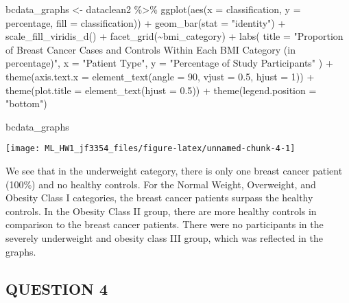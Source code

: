\documentclass[
]{article}
\newenvironment{Shaded}{\begin{snugshade}}{\end{snugshade}}
\newcommand{\AttributeTok}[1]{\textcolor[rgb]{0.77,0.63,0.00}{#1}}
\newcommand{\DecValTok}[1]{\textcolor[rgb]{0.00,0.00,0.81}{#1}}
\newcommand{\FloatTok}[1]{\textcolor[rgb]{0.00,0.00,0.81}{#1}}
\newcommand{\FunctionTok}[1]{\textcolor[rgb]{0.00,0.00,0.00}{#1}}
\newcommand{\NormalTok}[1]{#1}
\newcommand{\OtherTok}[1]{\textcolor[rgb]{0.56,0.35,0.01}{#1}}
\newcommand{\SpecialCharTok}[1]{\textcolor[rgb]{0.00,0.00,0.00}{#1}}
\newcommand{\StringTok}[1]{\textcolor[rgb]{0.31,0.60,0.02}{#1}}
\begin{document}
\begin{Shaded}
\begin{Highlighting}[]
\NormalTok{bcdata\_graphs }\OtherTok{\textless{}{-}}\NormalTok{ dataclean2 }\SpecialCharTok{\%\textgreater{}\%}
  \FunctionTok{ggplot}\NormalTok{(}\FunctionTok{aes}\NormalTok{(}\AttributeTok{x =}\NormalTok{ classification, }\AttributeTok{y =}\NormalTok{ percentage, }\AttributeTok{fill =}\NormalTok{ classification)) }\SpecialCharTok{+}
  \FunctionTok{geom\_bar}\NormalTok{(}\AttributeTok{stat =} \StringTok{"identity"}\NormalTok{) }\SpecialCharTok{+}
  \FunctionTok{scale\_fill\_viridis\_d}\NormalTok{() }\SpecialCharTok{+}
  \FunctionTok{facet\_grid}\NormalTok{(}\SpecialCharTok{\textasciitilde{}}\NormalTok{bmi\_category) }\SpecialCharTok{+}
  \FunctionTok{labs}\NormalTok{(}
    \AttributeTok{title =} \StringTok{"Proportion of Breast Cancer Cases and }
\StringTok{    Controls Within Each BMI Category (in percentage)"}\NormalTok{,}
    \AttributeTok{x =} \StringTok{"Patient Type"}\NormalTok{,}
    \AttributeTok{y =} \StringTok{"Percentage of Study Participants"}
\NormalTok{  ) }\SpecialCharTok{+} \FunctionTok{theme}\NormalTok{(}\AttributeTok{axis.text.x =} \FunctionTok{element\_text}\NormalTok{(}\AttributeTok{angle =} \DecValTok{90}\NormalTok{, }\AttributeTok{vjust =} \FloatTok{0.5}\NormalTok{, }\AttributeTok{hjust =} \DecValTok{1}\NormalTok{)) }\SpecialCharTok{+} \FunctionTok{theme}\NormalTok{(}\AttributeTok{plot.title =} \FunctionTok{element\_text}\NormalTok{(}\AttributeTok{hjust =} \FloatTok{0.5}\NormalTok{)) }\SpecialCharTok{+} \FunctionTok{theme}\NormalTok{(}\AttributeTok{legend.position =} \StringTok{"bottom"}\NormalTok{)}

\NormalTok{bcdata\_graphs}
\end{Highlighting}
\end{Shaded}

\texttt{[image: ML\_HW1\_jf3354\_files/figure-latex/unnamed-chunk-4-1]}

We see that in the underweight category, there is only one breast cancer
patient (100\%) and no healthy controls. For the Normal Weight,
Overweight, and Obesity Class I categories, the breast cancer patients
surpass the healthy controls. In the Obesity Class II group, there are
more healthy controls in comparison to the breast cancer patients. There
were no participants in the severely underweight and obesity class III
group, which was reflected in the graphs.

\hypertarget{question-4}{%
\subsection{QUESTION 4}\label{question-4}}
\end{document}

